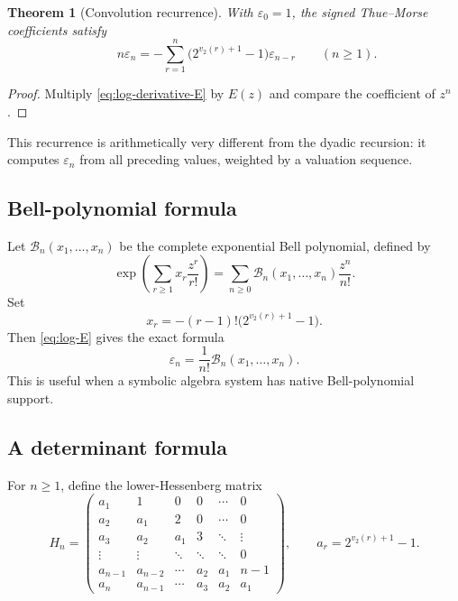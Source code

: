 \documentclass[11pt,oneside]{article}
\newtheorem{theorem}{Theorem}[section]
\theoremstyle{definition}
\theoremstyle{remark}
\newcommand{\vtwo}{v_2}
\newcommand{\eps}{\varepsilon}
\newcommand{\Bell}{\mathcal B}
\begin{document}
\begin{theorem}[Convolution recurrence]\label{thm:convolution-recurrence}
With $\eps_0=1$, the signed Thue--Morse coefficients satisfy
\begin{equation}\label{eq:convolution-recurrence}
 \boxed{\qquad
 n\eps_n=-\sum_{r=1}^{n}
       \bigl(2^{\vtwo(r)+1}-1\bigr)\eps_{n-r}
 \qquad(n\ge1).}
\end{equation}
\end{theorem}

\begin{proof}
Multiply \cref{eq:log-derivative-E} by $E(z)$ and compare the coefficient of
$z^n$.
\end{proof}

This recurrence is arithmetically very different from the dyadic recursion:
it computes $\eps_n$ from all preceding values, weighted by a valuation
sequence.

\subsection{Bell-polynomial formula}

Let $\Bell_n(x_1,\ldots,x_n)$ be the complete exponential Bell polynomial,
defined by
\begin{equation}\label{eq:Bell-definition}
 \exp\!\left(\sum_{r\ge1}x_r\frac{z^r}{r!}\right)
 =\sum_{n\ge0}\Bell_n(x_1,\ldots,x_n)\frac{z^n}{n!}.
\end{equation}
Set
\begin{equation}\label{eq:Bell-xr}
 x_r=-(r-1)!\bigl(2^{\vtwo(r)+1}-1\bigr).
\end{equation}
Then \cref{eq:log-E} gives the exact formula
\begin{equation}\label{eq:Bell-epsilon}
 \boxed{\qquad
 \eps_n=\frac1{n!}\Bell_n(x_1,\ldots,x_n).
 \qquad}
\end{equation}
This is useful when a symbolic algebra system has native Bell-polynomial
support.

\subsection{A determinant formula}

For $n\ge1$, define the lower-Hessenberg matrix
\begin{equation}\label{eq:Hn}
 H_n=\begin{pmatrix}
 a_1&1&0&0&\cdots&0\\
 a_2&a_1&2&0&\cdots&0\\
 a_3&a_2&a_1&3&\ddots&\vdots\\
 \vdots&\vdots&\ddots&\ddots&\ddots&0\\
 a_{n-1}&a_{n-2}&\cdots&a_2&a_1&n-1\\
 a_n&a_{n-1}&\cdots&a_3&a_2&a_1
 \end{pmatrix},
 \qquad a_r=2^{\vtwo(r)+1}-1.
\end{equation}
\end{document}
